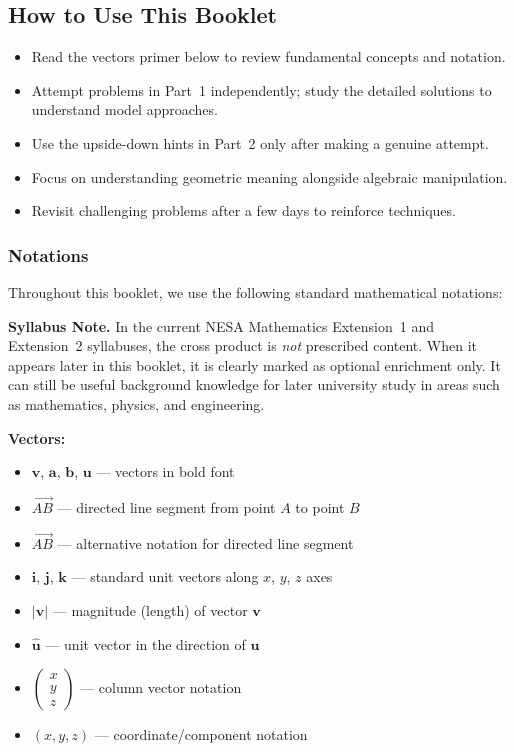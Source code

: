 \documentclass[12pt]{article}
\begin{document}
\subsection{How to Use This Booklet}
\begin{itemize}[leftmargin=*]
  \item Read the vectors primer below to review fundamental concepts and notation.
  \item Attempt problems in Part~1 independently; study the detailed solutions to understand model approaches.
  \item Use the upside-down hints in Part~2 only after making a genuine attempt.
  \item Focus on understanding geometric meaning alongside algebraic manipulation.
  \item Revisit challenging problems after a few days to reinforce techniques.
\end{itemize}

\subsubsection{Notations}
Throughout this booklet, we use the following standard mathematical notations:

\vspace{0.4em}
\noindent\textbf{Syllabus Note.} In the current NESA Mathematics Extension~1 and Extension~2 syllabuses, the cross product is \emph{not} prescribed content. When it appears later in this booklet, it is clearly marked as optional enrichment only. It can still be useful background knowledge for later university study in areas such as mathematics, physics, and engineering.

\vspace{0.3em}
\noindent\textbf{Vectors:}
\begin{itemize}[leftmargin=*]
  \item $\mathbf{v}$, $\mathbf{a}$, $\mathbf{b}$, $\mathbf{u}$ --- vectors in bold font
  \item $\overrightarrow{AB}$ --- directed line segment from point $A$ to point $B$
  \item $\vec{AB}$ --- alternative notation for directed line segment
  \item $\mathbf{i}$, $\mathbf{j}$, $\mathbf{k}$ --- standard unit vectors along $x$, $y$, $z$ axes
  \item $|\mathbf{v}|$ --- magnitude (length) of vector $\mathbf{v}$
  \item $\hat{\mathbf{u}}$ --- unit vector in the direction of $\mathbf{u}$
  \item $\begin{pmatrix} x \\ y \\ z \end{pmatrix}$ --- column vector notation
  \item $(x, y, z)$ --- coordinate/component notation
\end{itemize}
\end{document}
